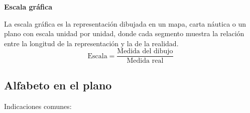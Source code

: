\begin{enumerate}
\begin{center}
	      \end{center}
\end{enumerate}

\textbf{Escala gráfica}

La escala gráfica es la representación dibujada en un mapa, carta náutica o un plano con escala unidad por unidad, donde cada segmento muestra la relación entre la longitud de la representación y la de la realidad.
\begin{equation}
	\text{Escala}=\frac{\text{Medida del dibujo}}{\text{Medida real}}
\end{equation}

\subsection{Alfabeto en el plano}
Indicaciones comunes:

